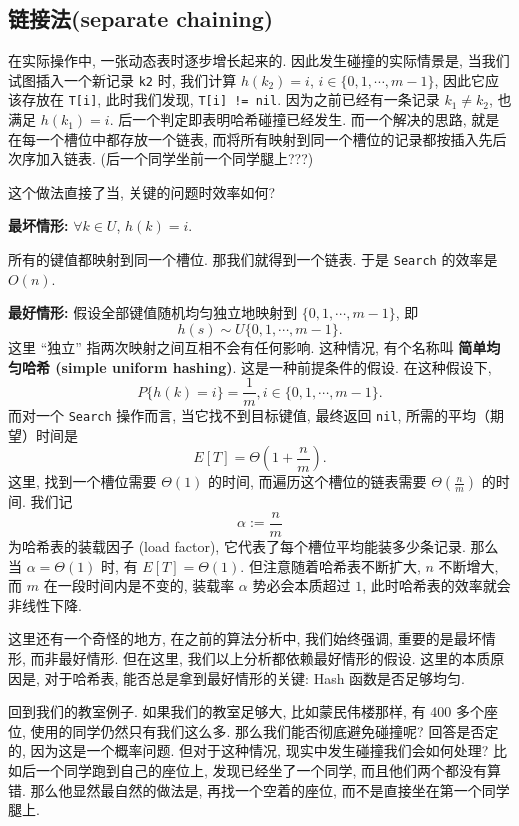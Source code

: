 \documentclass[a4paper]{ctexart}
\theoremstyle{definition}
\theoremstyle{definition}
\begin{document}
\subsection{链接法(separate chaining)}

在实际操作中, 一张动态表时逐步增长起来的. 因此发生碰撞的实际情景是, 当我们试图插入一个新记录 
\verb|k2| 时, 我们计算 $h(k_2) = i$, $i \in \{0, 1, \cdots, m - 1\}$, 
因此它应该存放在 \verb|T[i]|, 此时我们发现, \verb|T[i] != nil|. 因为之前已经有一条记录 $k_1 \neq k_2$, 
也满足 $h(k_1) = i$. 后一个判定即表明哈希碰撞已经发生. 而一个解决的思路, 就是在每一个槽位中都存放一个链表, 
而将所有映射到同一个槽位的记录都按插入先后次序加入链表. (后一个同学坐前一个同学腿上???)

这个做法直接了当, 关键的问题时效率如何? 

{\bf 最坏情形:} $\forall k \in U$, $h(k) = i$. 

所有的键值都映射到同一个槽位. 那我们就得到一个链表. 于是 \verb|Search| 的效率是 $O(n)$.

{\bf 最好情形:} 假设全部键值随机均匀独立地映射到 $\{0, 1, \cdots, m - 1\}$, 即
$$
h(s) \sim U\{0, 1, \cdots, m - 1\}.
$$
这里 ``独立'' 指两次映射之间互相不会有任何影响. 这种情况, 有个名称叫
{\bf 简单均匀哈希 (simple uniform hashing)}. 这是一种前提条件的假设. 在这种假设下,
$$
P\{h(k) = i\} = \frac{1}{m}, i \in \{0, 1, \cdots, m - 1\}.
$$
而对一个 \verb|Search| 操作而言, 当它找不到目标键值, 最终返回 \verb|nil|, 
所需的平均（期望）时间是
$$
E[T] = \Theta(1 + \frac{n}{m}).
$$
这里, 找到一个槽位需要 $\Theta(1)$ 的时间, 而遍历这个槽位的链表需要
$\Theta(\frac{n}{m})$ 的时间. 我们记
$$
\alpha := \frac{n}{m}
$$
为哈希表的装载因子 (load factor), 它代表了每个槽位平均能装多少条记录.
那么当 $\alpha = \Theta(1)$ 时, 有 $E[T] = \Theta(1)$.
但注意随着哈希表不断扩大, $n$ 不断增大, 而 $m$ 在一段时间内是不变的,
装载率 $\alpha$ 势必会本质超过 $1$, 此时哈希表的效率就会非线性下降. 

这里还有一个奇怪的地方, 在之前的算法分析中, 我们始终强调, 重要的是最坏情形, 
而非最好情形. 但在这里, 我们以上分析都依赖最好情形的假设. 这里的本质原因是, 
对于哈希表, 能否总是拿到最好情形的关键: Hash 函数是否足够均匀. 

回到我们的教室例子. 如果我们的教室足够大, 比如蒙民伟楼那样, 有 400 多个座位, 
使用的同学仍然只有我们这么多. 那么我们能否彻底避免碰撞呢? 回答是否定的, 
因为这是一个概率问题. 但对于这种情况, 现实中发生碰撞我们会如何处理? 
比如后一个同学跑到自己的座位上, 发现已经坐了一个同学, 而且他们两个都没有算错. 
那么他显然最自然的做法是, 再找一个空着的座位, 而不是直接坐在第一个同学腿上. 
\end{document}

